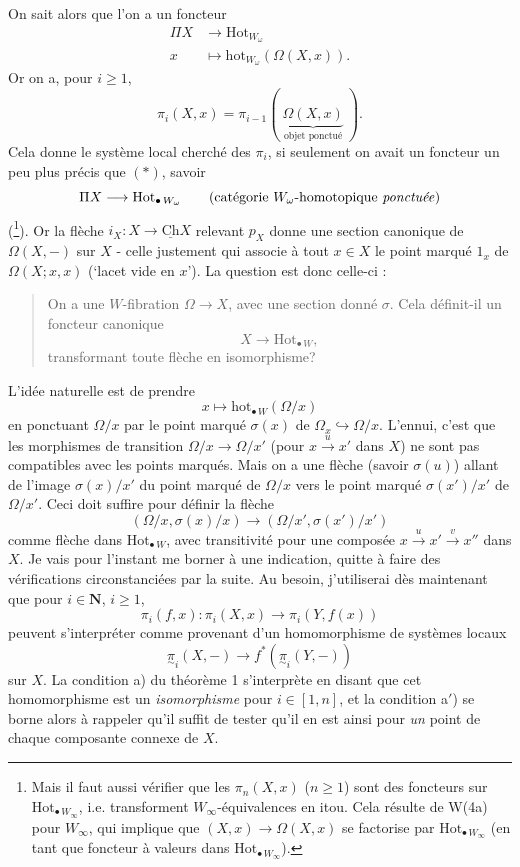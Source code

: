 \documentclass[11pt]{article}
\newcommand{\printedpage}[1]{\marginpar{\footnotesize p.~#1}}
\newcommand{\msp}[1]{\marginpar{\footnotesize [#1]}}
\newcommand{\Ch}{\underline{\mathrm{Ch}}}
\newcommand{\Hotp}[1]{\mathrm{Hot}_{\bullet\,#1}}
\newcommand{\hotp}[1]{\mathrm{hot}_{\bullet\,#1}}
\newcommand{\utpi}{\underset{\sim}{\pi}}
\begin{document}
On sait alors que l'on a un foncteur
\[
\begin{aligned}
\Pi X &\longrightarrow \mathrm{Hot}_{W_\omega}\\
x &\longmapsto \mathrm{hot}_{W_\omega}(\Omega(X,x)).
\end{aligned}
\tag*{$(*)$}
\]
Or on a, pour $i \geq 1$,
\[
\pi_i(X,x) = \pi_{i-1}(\ \underbrace{\Omega(X,x)}_{\text{objet ponctué}}\ ).
\]
Cela donne le système local cherché des $\pi_i$, si seulement on avait un foncteur un peu plus précis que $(*)$, savoir
\[
\Pi X \longrightarrow \Hotp{W_\omega} \qquad \text{(catégorie $W_\omega$-homotopique \textit{ponctuée})}
\]
(\footnote[114]{Mais il faut aussi vérifier que les $\pi_n(X,x)$ ($n \geq 1$) sont des foncteurs sur $\Hotp{W_\infty}$, i.e. transforment $W_\infty$-équivalences en itou. Cela résulte de W(4a) pour $W_\infty$, qui implique que $(X,x) \longrightarrow \Omega(X,x)$ se factorise par $\Hotp{W_\infty}$ (en tant que foncteur à valeurs dans $\Hotp{W_\infty}$).}). Or la flèche $i_X : X \longrightarrow \Ch X$ relevant $p_X$ donne une section canonique de $\Omega(X,-)$ sur $X$ -
\msp{page 174}
celle justement qui associe à tout $x \in X$ le point marqué $1_x$ de $\Omega(X;x,x)$ (`lacet vide en $x$'). La question est donc celle-ci :

\begin{quote}
On a une $W$-fibration $\Omega \longrightarrow X$, avec une section donné $\sigma$. Cela définit-il un foncteur canonique %
\[
X \longrightarrow \Hotp{W},
\]
transformant toute flèche en isomorphisme?
\end{quote}

L'idée naturelle est de prendre
\[
x \longmapsto \hotp{W}(\Omega/x)
\]
en ponctuant $\Omega/x$ par le point marqué $\sigma(x)$ de $\Omega_x \hookrightarrow \Omega/x$. L'ennui, c'est que les morphismes de transition $\Omega/x \longrightarrow \Omega/x'$ (pour $x \xrightarrow{u} x'$ dans $X$) ne sont pas compatibles avec les points marqués. Mais on a une flèche (savoir $\sigma(u)$) allant
\msp{page 175}
de l'image $\sigma(x)/x'$ du point marqué de $\Omega/x$ vers le point marqué $\sigma(x')/x'$ de $\Omega/x'$. Ceci doit suffire pour définir la flèche
\[
(\Omega/x,\sigma(x)/x) \longrightarrow (\Omega/x',\sigma(x')/x')
\]
comme flèche dans $\Hotp{W}$, avec transitivité pour une composée $x \xrightarrow{u} x' \xrightarrow{v} x''$ dans $X$. Je vais pour l'instant me borner
\printedpage{118}
\msp{page 176}
à une indication, quitte à faire des vérifications circonstanciées par la suite. Au besoin, j'utiliserai dès maintenant que pour $i \in \mathbf{N}$, $i \geq 1$,
\[
\pi_i(f,x) : \pi_i(X,x) \longrightarrow \pi_i(Y,f(x))
\]
peuvent s'interpréter comme provenant d'un homomorphisme de systèmes locaux
\[
\utpi_i(X,-) \longrightarrow f^*(\utpi_i(Y,-))
\]
sur $X$. La condition a) du théorème 1 s'interprète en disant que cet homomorphisme est un \textit{isomorphisme} pour $i \in [1,n]$, et la condition a$'$) se borne alors à rappeler qu'il suffit de tester qu'il en est ainsi pour \textit{un} point de chaque composante connexe de $X$.
\end{document}
